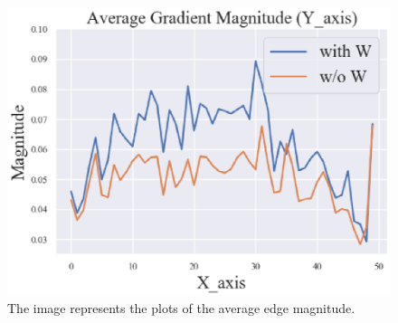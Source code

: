 \begin{figure}[tb]
	\centering
	\includegraphics[width=0.5\hsize]{images/adaptive/graph_edge.eps}
	\caption{The image represents the plots of the average edge magnitude.} \label{fig:adaptive/edge_magnitude}
\end{figure}

